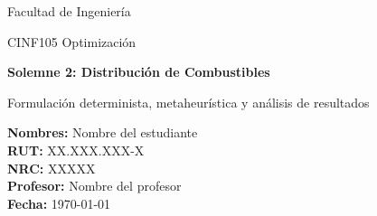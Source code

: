 \documentclass[12pt,letterpaper]{article}
\begin{document}
\begin{titlepage}
    \centering
    
    {\Large Facultad de Ingeniería \par}
    \vspace{0.5cm}
    {\Large CINF105 Optimización \par}
    
    \vspace{3cm}
    
    {\Huge \textbf{Solemne 2: Distribución de Combustibles} \par}
    
    \vspace{1cm}
    
    {\Large Formulación determinista, metaheurística y análisis de resultados \par}
    
    \vfill
    
    \begin{flushleft}
    \textbf{Nombres:} Nombre del estudiante \\
    \textbf{RUT:} XX.XXX.XXX-X \\
    \textbf{NRC:} XXXXX \\
    \textbf{Profesor:} Nombre del profesor \\
    \textbf{Fecha:} \today
    \end{flushleft}
\end{titlepage}

\tableofcontents
\newpage











\newpage
\appendix
\end{document}
